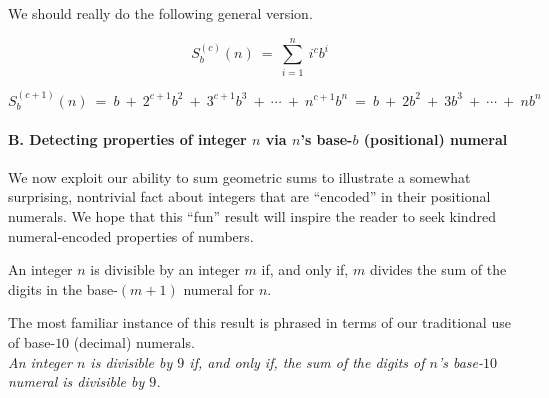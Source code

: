 {\Arny We should really do the following general version.}

\[
S_b^{(c)}(n) \ = \ \sum_{i=1}^n \ i^c b^i
\]

\[
S_b^{(c+1)}(n)
 \ = \
b \ + \ 2^{c+1} b^2\ + \ 3^{c+1} b^3 \ + \ \cdots \ + \ n^{c+1} b^n
 \ = \
b \ + \ 2 b^2\ + \ 3 b^3 \ + \ \cdots \ + \ n b^n
\]




\paragraph{B. Detecting properties of integer $n$ via $n$'s base-$b$ (positional) numeral}

We now exploit our ability to sum geometric sums to illustrate a
somewhat surprising, nontrivial fact about integers that are
``encoded'' in their positional numerals.  We hope that this ``fun''
result will inspire the reader to seek kindred numeral-encoded
properties of numbers.

\begin{prop}
\label{thm:div-by-b-bar}
An integer $n$ is divisible by an integer $m$ if, and only if, $m$
divides the sum of the digits in the base-$(m+1)$ numeral for $n$.
\end{prop}

The most familiar instance of this result is phrased in terms of our
traditional use of base-$10$ (decimal) numerals. \\
{\it An integer $n$ is divisible by $9$ if, and only if, the sum of
  the digits of $n$'s base-$10$ numeral is divisible by $9$.}

\smallskip

